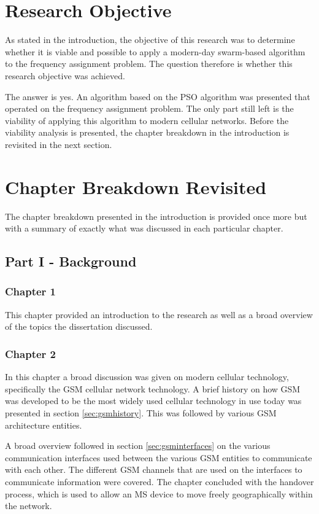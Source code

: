 \section{Research Objective}
As stated in the introduction, the objective of this research was to determine whether it is viable and possible to apply a modern-day swarm-based algorithm to the frequency assignment problem. 
The question therefore is whether this research objective was achieved.

The answer is yes. An algorithm based on the PSO algorithm was presented that operated on the frequency assignment problem. The only part still left is the viability of applying this algorithm to modern cellular networks.
Before the viability analysis is presented, the chapter breakdown in the introduction is revisited in the next section.

\section{Chapter Breakdown Revisited}
The chapter breakdown presented in the introduction is provided once more but with a summary of exactly what was discussed in each particular chapter.
\subsection{Part I - Background}
\subsubsection{Chapter 1}
This chapter provided an introduction to the research as well as a broad overview of the topics the dissertation discussed. 
\subsubsection{Chapter 2}
In this chapter a broad discussion was given on modern cellular technology, specifically the GSM cellular network technology. A brief history on how GSM was developed to be the most widely used cellular technology in use today was presented in section \ref{sec:gsmhistory}. This was followed by various GSM architecture entities.

A broad overview followed in section \ref{sec:gsminterfaces} on the various communication interfaces used between the various GSM entities to communicate with each other. The different GSM channels that are used on the interfaces to communicate information were covered.
The chapter concluded with the handover process, which is used to allow an MS device to move freely geographically within the network. 
